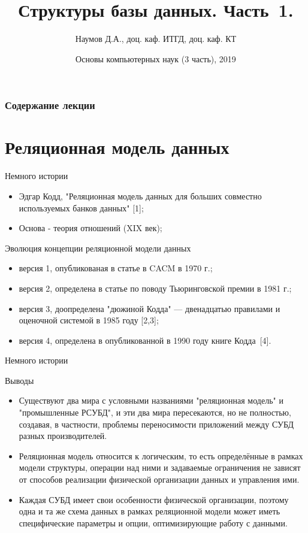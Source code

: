 \documentclass{beamer}
\title[СУБД]{Структуры базы данных. Часть~1. }
\author{Наумов Д.А., доц. каф. ИТГД, доц. каф. КТ}
\date[28.02.2019] {Основы компьютерных наук (3 часть), 2019}
\begin{document}
\begin{frame}
  \titlepage
\end{frame}
  
\begin{frame}
  \frametitle{Содержание лекции}
  \tableofcontents  
\end{frame}
  
\section{Реляционная модель данных}
\begin{frame}{Немного истории}
\begin{itemize}
\item Эдгар Кодд, "Реляционная модель данных для больших совместно используемых банков данных" [1];
\item Основа - теория отношений (XIX век);
\end{itemize}
\begin{block}{Эволюция концепции реляционной модели данных}
\begin{itemize}
\item версия 1, опубликованая в статье в CACM в 1970 г.;
\item версия 2, определена в статье по поводу Тьюринговской премии в 1981 г.;
\item версия 3, доопределена "дюжиной Кодда" — двенадцатью правилами и оценочной системой в 1985 году [2,3];
\item версия 4, определена в опубликованной в 1990 году книге Кодда~[4].
\end{itemize}
\end{block}
\end{frame} 

\begin{frame}{Немного истории}
\begin{block}{Выводы}
\begin{itemize}
\item Существуют два мира с условными названиями "реляционная модель" и "промышленные РСУБД", и эти два мира
пересекаются, но не полностью, создавая, в частности, проблемы переносимости приложений между СУБД разных производителей.
\item Реляционная модель относится к логическим, то есть определённые в рамках модели
структуры, операции над ними и задаваемые ограничения не зависят от способов реализации физической организации данных и управления ими.
\item Каждая СУБД имеет свои особенности физической организации, поэтому одна и та же схема данных в рамках реляционной модели может иметь специфические параметры и опции, оптимизирующие работу с данными.
\end{itemize}
\end{block}
\end{frame} 
\end{document}

